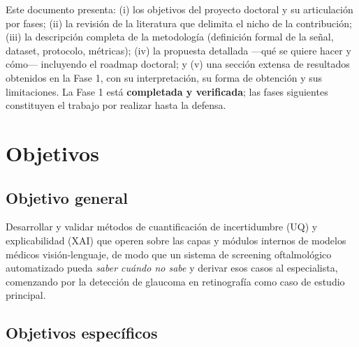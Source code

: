 \documentclass[12pt,a4paper]{article}
\begin{document}
Este documento presenta: (i) los objetivos del proyecto doctoral y su
articulación por fases; (ii) la revisión de la literatura que delimita el
nicho de la contribución; (iii) la descripción completa de la metodología
(definición formal de la señal, dataset, protocolo, métricas); (iv) la
propuesta detallada ---qué se quiere hacer y cómo--- incluyendo el roadmap
doctoral; y (v) una sección extensa de resultados obtenidos en la Fase 1,
con su interpretación, su forma de obtención y sus limitaciones. La Fase 1
está \textbf{completada y verificada}; las fases siguientes constituyen el
trabajo por realizar hasta la defensa.

\section{Objetivos}

\subsection{Objetivo general}

Desarrollar y validar métodos de cuantificación de incertidumbre (UQ) y
explicabilidad (XAI) que operen sobre las capas y módulos internos de
modelos médicos visión-lenguaje, de modo que un sistema de screening
oftalmológico automatizado pueda \emph{saber cuándo no sabe} y derivar
esos casos al especialista, comenzando por la detección de glaucoma en
retinografía como caso de estudio principal.

\subsection{Objetivos específicos}
\end{document}
